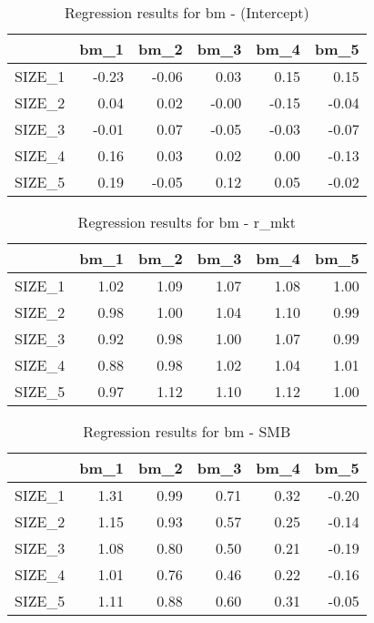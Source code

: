 \begin{table}[ht]
\centering
\caption{Regression results for bm - (Intercept)} 
\begin{tabular}{rrrrrr}
  \hline
 & bm\_1 & bm\_2 & bm\_3 & bm\_4 & bm\_5 \\ 
  \hline
SIZE\_1 & -0.23 & -0.06 & 0.03 & 0.15 & 0.15 \\ 
  SIZE\_2 & 0.04 & 0.02 & -0.00 & -0.15 & -0.04 \\ 
  SIZE\_3 & -0.01 & 0.07 & -0.05 & -0.03 & -0.07 \\ 
  SIZE\_4 & 0.16 & 0.03 & 0.02 & 0.00 & -0.13 \\ 
  SIZE\_5 & 0.19 & -0.05 & 0.12 & 0.05 & -0.02 \\ 
   \hline
\end{tabular}
\end{table}


\begin{table}[ht]
\centering
\caption{Regression results for bm - r_mkt} 
\begin{tabular}{rrrrrr}
  \hline
 & bm\_1 & bm\_2 & bm\_3 & bm\_4 & bm\_5 \\ 
  \hline
SIZE\_1 & 1.02 & 1.09 & 1.07 & 1.08 & 1.00 \\ 
  SIZE\_2 & 0.98 & 1.00 & 1.04 & 1.10 & 0.99 \\ 
  SIZE\_3 & 0.92 & 0.98 & 1.00 & 1.07 & 0.99 \\ 
  SIZE\_4 & 0.88 & 0.98 & 1.02 & 1.04 & 1.01 \\ 
  SIZE\_5 & 0.97 & 1.12 & 1.10 & 1.12 & 1.00 \\ 
   \hline
\end{tabular}
\end{table}


\begin{table}[ht]
\centering
\caption{Regression results for bm - SMB} 
\begin{tabular}{rrrrrr}
  \hline
 & bm\_1 & bm\_2 & bm\_3 & bm\_4 & bm\_5 \\ 
  \hline
SIZE\_1 & 1.31 & 0.99 & 0.71 & 0.32 & -0.20 \\ 
  SIZE\_2 & 1.15 & 0.93 & 0.57 & 0.25 & -0.14 \\ 
  SIZE\_3 & 1.08 & 0.80 & 0.50 & 0.21 & -0.19 \\ 
  SIZE\_4 & 1.01 & 0.76 & 0.46 & 0.22 & -0.16 \\ 
  SIZE\_5 & 1.11 & 0.88 & 0.60 & 0.31 & -0.05 \\ 
   \hline
\end{tabular}
\end{table}


